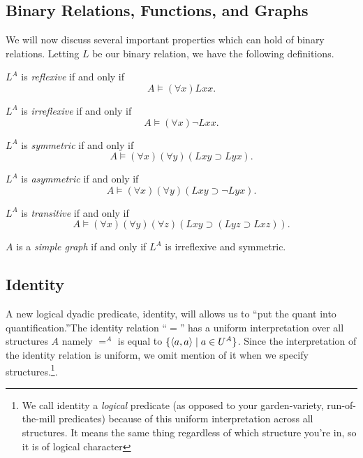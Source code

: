 \subsection{Binary Relations, Functions, and Graphs}
We will now discuss several important properties which can hold of binary relations. Letting $L$ be our binary relation, we have the following definitions. 

\begin{definition}
$L^A$ is \emph{reflexive} if and only if
\[A\models (\forall x)Lxx.\]
\end{definition}

\begin{definition}
$L^A$ is \emph{irreflexive} if and only if
\[A\models (\forall x)\neg Lxx.\]
\end{definition}

\begin{definition}
$L^A$ is \emph{symmetric} if and only if
\[A\models (\forall x)(\forall y)(Lxy\supset Lyx).\]
\end{definition}

\begin{definition}
$L^A$ is \emph{asymmetric} if and only if
\[A\models (\forall x)(\forall y)(Lxy\supset \neg Lyx).\]
\end{definition}

\begin{definition}
$L^A$ is \emph{transitive} if and only if
\[A\models (\forall x)(\forall y)(\forall z)(Lxy\supset (Lyz\supset Lxz)).\]
\end{definition}

\begin{definition}
$A$ is a \emph{simple graph} if and only if $L^A$ is irreflexive and symmetric.
\end{definition}

\subsection*{Identity}
A new logical dyadic predicate, identity, will  allows us to ``put the quant into quantification.''The identity relation ``$=$'' has a uniform interpretation over all structures $A$ namely $=^A$ is equal to $\{\mbox{$\langle a,a \rangle$}\mid a\in U^A\}$. Since the interpretation of the identity relation is uniform, we omit mention of it when we specify structures.\footnote{We call identity a \emph{logical} predicate (as opposed to your garden-variety, run-of-the-mill predicates) because of this uniform interpretation across all structures. It means the same thing regardless of which structure you're in, so it is of logical character}. 


